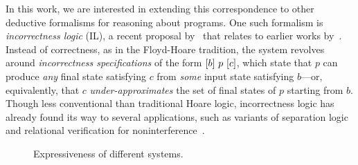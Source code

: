 In this work, we are interested in extending this correspondence to other
deductive formalisms for reasoning about programs.  One such formalism is
\emph{incorrectness logic} (IL), a recent proposal
by~\citet{OHearn_2020} that relates to earlier works
by~\citet{devries_ReverseHoareLogic_2011}. 
Instead of correctness, as in the Floyd-Hoare tradition, the system
revolves around \emph{incorrectness specifications} of the form
\([b]~p~[c]\), which state that \(p\) can produce \emph{any} final
state satisfying \(c\) from \emph{some} input state satisfying \(b\)---or,
equivalently, that \(c\) \emph{under-approximates} the set of final states of
\(p\) starting from \(b\).  Though less conventional than traditional Hoare
logic, incorrectness logic has already found its way to several applications,
such as variants of separation logic~\cite{Raad_Berdine_Dang_Dreyer_OHearn_Villard_2020} 
and relational verification for noninterference~\cite{murray_UnderApproximateRelationalLogic_2020a}.

\begin{figure}
    \centering
    \caption{Expressiveness of different systems.}\label{fig:expressiveness-of-different-kat}
\end{figure}


